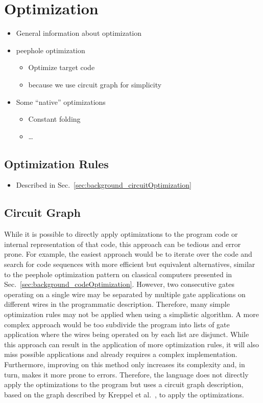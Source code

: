 \section{Optimization}
\begin{itemize}
    \item General information about optimization
    \item peephole optimization
    \begin{itemize}
        \item Optimize target code
        \item because we use circuit graph for simplicity
    \end{itemize}
    \item Some ``native'' optimizations
    \begin{itemize}
        \item Constant folding
        \item \dots
    \end{itemize}
\end{itemize}

\subsection{Optimization Rules}
\begin{itemize}
    \item Described in Sec.~\ref{sec:background_circuitOptimization}
\end{itemize}

\subsection{Circuit Graph}
\label{sec:concept_circuitGraph}
While it is possible to directly apply optimizations to the program code or internal representation of that code, this approach can be tedious and error prone. For example, the easiest approach would be to iterate over the code and search for code sequences with more efficient but equivalent alternatives, similar to the peephole optimization pattern on classical computers presented in Sec.~\ref{sec:background_codeOptimization}. However, two consecutive gates operating on a single wire may be separated by multiple gate applications on different wires in the programmatic description. Therefore, many simple optimization rules may not be applied when using a simplistic algorithm. A more complex approach would be too subdivide the program into lists of gate application where the wires being operated on by each list are disjunct. While this approach can result in the application of more optimization rules, it will also miss possible applications and already requires a complex implementation. Furthermore, improving on this method only increases its complexity and, in turn, makes it more prone to errors. Therefore, the language does not directly apply the optimizations to the program but uses a circuit graph description, based on the graph described by Kreppel et al.~\cite{KMO*23}, to apply the optimizations.

